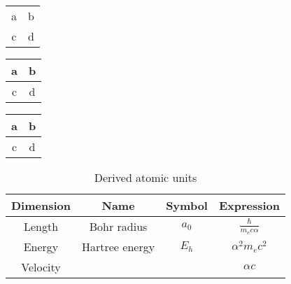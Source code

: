 \documentclass{ctexart}
\begin{document}
\begin{tabular}{|c|c|}
a & b \\
c & d\\
\end{tabular}

\begin{tabular}{|c|c|}
\hline
a & b \\
\hline
c & d\\
\hline
\end{tabular}

\begin{center}
\begin{tabular}{|c|c|}
\hline
a & b \\ \hline
c & d\\
\hline
\end{tabular}
\end{center}

\begin{table}[!hbp]
\centering
\begin{tabular}{|c|c|c|c|}
\hline
\hline
Dimension & Name & Symbol & Expression \\
\hline
Length & Bohr radius & $a_0$ & $\frac{\hbar}{m_e c\alpha}$\\
\hline
Energy & Hartree energy &  $E_h$ & $\alpha^2 m_e c^2$\\
\hline
Velocity & & & $\alpha c$\\
\hline
\end{tabular}
\caption{Derived atomic units}
\end{table}
\end{document}
